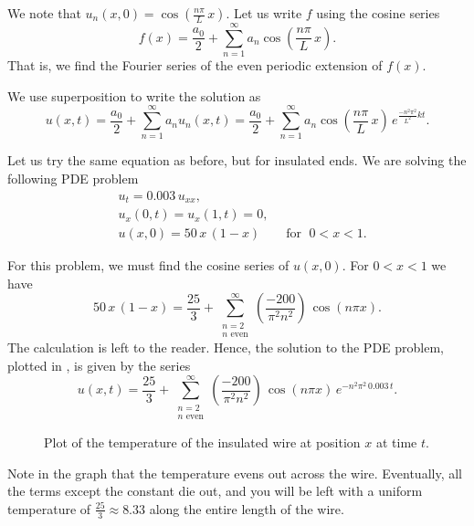 \documentclass[12pt]{book}
\begin{document}
We note that $u_n(x,0) = \cos \left( \frac{n \pi}{L} \, x \right)$.  Let us
write $f$ using the cosine series
\begin{equation*}
f(x) = \frac{a_0}{2} + \sum_{n=1}^\infty a_n \cos \left( \frac{n \pi}{L} \, x
\right) .
\end{equation*}
That is, we find the Fourier series of the even periodic extension of $f(x)$.

We use superposition to write the solution as
\begin{equation*}
\boxed{~~
u(x,t) = 
\frac{a_0}{2} + 
\sum_{n=1}^\infty
a_n
u_n(x,t)
=
\frac{a_0}{2} + 
\sum_{n=1}^\infty
a_n
\cos \left( \frac{n \pi}{L} \, x \right)
\, e^{\frac{-n^2 \pi^2}{L^2} k t} .
~~}
\end{equation*}

\begin{example}
Let us try the same equation as before, but for insulated ends.
We are solving the following PDE problem
\begin{align*}
& u_t = 0.003 \, u_{xx} , \\
& u_x(0,t) = u_x(1,t) = 0 , \\
& u(x,0) = 50\,x\,(1-x) \qquad \text{for } \; 0 < x < 1 .
\end{align*}

For this problem, we must find the cosine series of $u(x,0)$.
For $0 < x < 1$ we have
\begin{equation*}
50\, x\,(1-x)
=
\frac{25}{3} +
\sum_{\substack{n=2 \\ n \text{ even}}}^\infty
\left( \frac{-200}{\pi^2 n^2} \right) \,
\cos (n \pi x) .
\end{equation*}
The calculation is left to the reader.
Hence, the solution to the PDE problem, plotted in
, is given by the series
\begin{equation*}
u(x,t)
=
\frac{25}{3} +
\sum_{\substack{n=2 \\ n \text{ even}}}^\infty
\left( \frac{-200}{\pi^2 n^2} \right) \,
\cos ( n \pi x)
\, e^{-n^2 \pi^2 \, 0.003 \, t} .
\end{equation*}

\begin{figure}[h!t]
\capstart
\begin{center}
\caption{Plot of the temperature of the insulated wire at position $x$
at time $t$.\label{heat:wireisolexfig}}
\end{center}
\end{figure}

Note in the graph
that the temperature evens out across the wire.  Eventually, all the
terms except the constant
die out, and you will be left with a uniform temperature
of $\frac{25}{3} \approx 8.33$ along the entire length of the wire.
\end{example}
\end{document}
